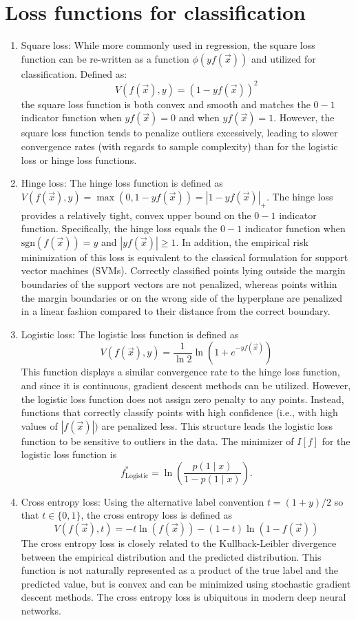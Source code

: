\documentclass{article}
\begin{document}
\section{Loss functions for classification}
\begin{enumerate}
\item Square loss: While more commonly used in regression, the square loss function can be re-written as a function $\phi (yf({\vec {x}}))$ and utilized for classification. Defined as:
\[V(f({\vec {x}}),y)=(1-yf({\vec {x}}))^{2}\]
the square loss function is both convex and smooth and matches the $0-1$ indicator function when $yf({\vec {x}})=0$ and when $yf({\vec {x}})=1$. However, the square loss function tends to penalize outliers excessively, leading to slower convergence rates (with regards to sample complexity) than for the logistic loss or hinge loss functions.
\item Hinge loss: The hinge loss function is defined as
$V(f({\vec {x}}),y)=\max(0,1-yf({\vec {x}}))=|1-yf({\vec {x}})|_{{+}}$.
The hinge loss provides a relatively tight, convex upper bound on the $0-1$ indicator function. Specifically, the hinge loss equals the $0-1$ indicator function when $\mathrm{sgn}(f({\vec {x}}))=y$ and $|yf({\vec {x}})|\geq 1$. In addition, the empirical risk minimization of this loss is equivalent to the classical formulation for support vector machines (SVMs). Correctly classified points lying outside the margin boundaries of the support vectors are not penalized, whereas points within the margin boundaries or on the wrong side of the hyperplane are penalized in a linear fashion compared to their distance from the correct boundary.
\item Logistic loss: The logistic loss function is defined as
\[ V(f({\vec {x}}),y)={\frac {1}{\ln 2}}\ln(1+e^{{-yf({\vec {x}})}})\]
This function displays a similar convergence rate to the hinge loss function, and since it is continuous, gradient descent methods can be utilized. However, the logistic loss function does not assign zero penalty to any points. Instead, functions that correctly classify points with high confidence (i.e., with high values of $|f({\vec {x}})|)$ are penalized less. This structure leads the logistic loss function to be sensitive to outliers in the data.
The minimizer of $I[f]$ for the logistic loss function is
\[ f_{{\text{Logistic}}}^{*}=\ln \left({\frac {p(1\mid x)}{1-p(1\mid x)}}\right).\]
\item Cross entropy loss: Using the alternative label convention $t=(1+y)/2$ so that $t \in \{0,1\}$, the cross entropy loss is defined as 
\[V(f(\vec{x}),t) = -t\ln(f(\vec{x}))-(1-t)\ln(1-f(\vec{x}))\]
The cross entropy loss is closely related to the Kullback-Leibler divergence between the empirical distribution and the predicted distribution. This function is not naturally represented as a product of the true label and the predicted value, but is convex and can be minimized using stochastic gradient descent methods. The cross entropy loss is ubiquitous in modern deep neural networks. 
\end{enumerate}
\end{document}
